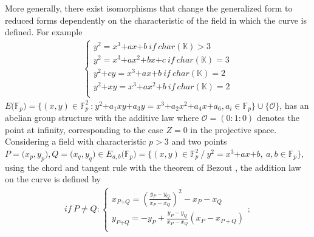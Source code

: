 \documentclass[sigconf,balance=false]{acmart}
\begin{document}
\begin{enumerate}
More generally, there exist isomorphisms that change the generalized form to reduced forms dependently on the characteristic of the field in which the curve is defined. For example 
\begin{eqnarray}
\left\lbrace
\begin{array}{ll}
y^{2}=x^{3}\text{+}ax\text{+}b \ if \ char(\mathbb{K})>3 \\
y^{2}=x^{3}\text{+}ax^{2}\text{+}bx\text{+}c \ if \ char(\mathbb{K})=3 \\
y^{2}\text{+}cy=x^{3}\text{+}ax\text{+}b \ if \ char(\mathbb{K})=2 \\
y^{2}\text{+}xy=x^{3}\text{+}ax^{2}\text{+}b \ if \ char(\mathbb{K})=2 \\
\end{array} \right.
\end{eqnarray}
$E\text{(}\mathbb{F}_{p}\text{)}=\lbrace (x, y)\in \mathbb{F}_{p}^{2} \ \text{:} \ y^{2}\text{+}a_{1}xy\text{+}a_{3}y=x^{3}\text{+}a_{2}x^{2}\text{+}a_{4}x\text{+}a_{6},a_{i}\in \mathbb{F}_{p} \rbrace \cup \lbrace \mathcal{O} \rbrace$, has an abelian group structure with the additive law where $\mathcal{O}=(0:1:0)$ denotes the point at infinity, corresponding to the case $Z=0$ in the projective space. \\ 
Considering a field with characteristic $p>3$ and two points $P=\text{(}x_{p}, y_{p}\text{)}, Q=\text{(}x_{q}, y_{q}\text{)} \in E_{a, b}\text{(}\mathbb{F}_{p}\text{)}=\lbrace (x, y)\in \mathbb{F}_{p}^{2} \ / \ y^{2}=x^{3}\text{+}ax\text{+}b, \ a, b\in \mathbb{F}_{p} \rbrace$, using the chord and tangent rule with the theorem of Bezout \cite{bezou}, the addition law on the curve is defined by
\begin{eqnarray*}
if \ P \neq Q:
\left\lbrace
\begin{array}{ll}
x_{P\text{+}Q}=\left( \frac{y_{P}-y_{Q}}{x_{P}-x_{Q}}\right) ^{2}- x_{P} -x_{Q}\\
y_{P\text{+}Q}=-y_{P}+\frac{y_{P}-y_{Q}}{x_{P}-x_{Q}}\left(x_{P} -x_{P+Q}\right)\\
\end{array} \right. ;
\end{eqnarray*}


\end{enumerate}
\end{document}
